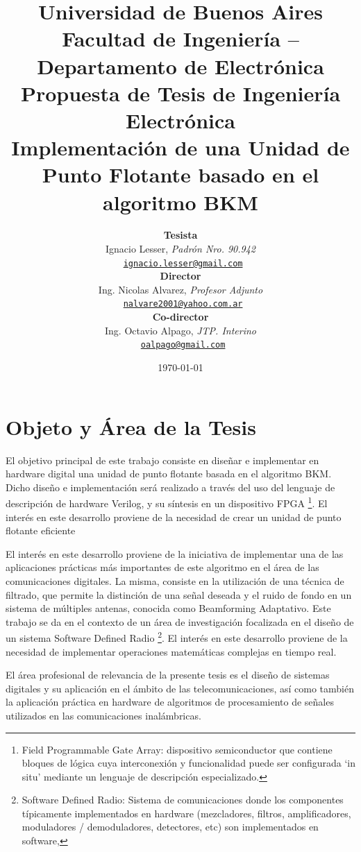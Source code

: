 \documentclass[a4paper]{article}
\title{
   {\normalsize
      Universidad de Buenos Aires\\
      Facultad de Ingeniería -- Departamento de Electrónica\\
      Propuesta de Tesis de Ingeniería Electrónica\\
      \vspace{0.7cm}
   }
   Implementación de una Unidad de Punto Flotante basado en el algoritmo BKM
}
\author{ \textbf{Tesista}                                                           \\
         Ignacio Lesser, \textit{Padrón Nro. 90.942}                                \\
         \texttt{ \href{mailto:ignacio.lesser@gmail.com}{ignacio.lesser@gmail.com}}  \\[2.5ex]
         \textbf{Director}                                                          \\
         Ing. Nicolas Alvarez, \textit{Profesor Adjunto}                            \\
         \texttt{ \href{mailto:nalvare2001@yahoo.com.ar}{nalvare2001@yahoo.com.ar}} \\[2.5ex]
         \textbf{Co-director}                                                       \\
         Ing. Octavio Alpago, \textit{JTP. Interino}                                \\
         \texttt{ \href{mailto:oalpago@gmail.com}{oalpago@gmail.com}}               \\[2.5ex]
       }
\date{\today}
\begin{document}
\maketitle



\thispagestyle{fancy}

\section{Objeto y Área de la Tesis}

El objetivo principal de este trabajo consiste en diseñar e implementar en hardware digital una unidad de punto flotante basada en el algoritmo BKM. Dicho diseño e implementación será realizado a través del uso del lenguaje de descripción de hardware Verilog, y su síntesis en un dispositivo FPGA \footnote{\label{FPGA}Field Programmable Gate Array: dispositivo semiconductor que contiene bloques de lógica cuya interconexión y funcionalidad puede ser configurada `in situ' mediante un lenguaje de descripción especializado.}.
El interés en este desarrollo proviene de la necesidad de crear un unidad de punto flotante eficiente 

El interés en este desarrollo proviene de la iniciativa de implementar una de las aplicaciones prácticas más importantes de este algoritmo en el área de las comunicaciones digitales. La misma, consiste en la utilización de una técnica de filtrado, que permite la distinción de una señal deseada y el ruido de fondo en un sistema de múltiples antenas, conocida como Beamforming Adaptativo. Este trabajo se da en el contexto de un área de investigación focalizada en el diseño de un sistema Software Defined Radio \footnote{\label{SDR}Software Defined Radio: Sistema de comunicaciones donde los componentes típicamente implementados en hardware (mezcladores, filtros, amplificadores, moduladores / demoduladores, detectores, etc) son implementados en software,}.
El interés en este desarrollo proviene de la necesidad de implementar operaciones matem\'aticas complejas en tiempo real.

El área profesional de relevancia de la presente tesis es el diseño de sistemas digitales y su aplicación en el ámbito de las telecomunicaciones, así como también la aplicación práctica en hardware de algoritmos de procesamiento de señales utilizados en las comunicaciones inalámbricas.
\end{document}
